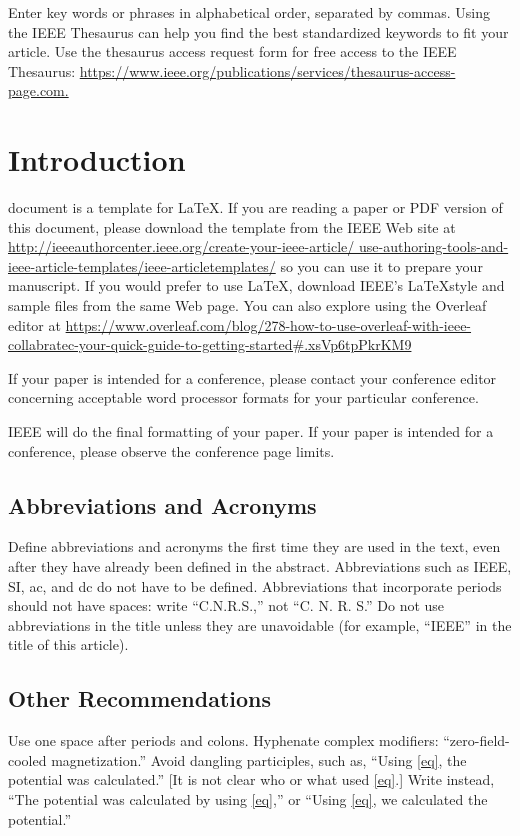 \documentclass[journal,onecolumn,web]{ieeecolor}
\begin{document}
\begin{IEEEkeywords}
Enter key words or phrases in alphabetical order, separated by commas. Using the IEEE Thesaurus can help you find the best standardized keywords to fit your article. Use the thesaurus access request form for free access to the IEEE Thesaurus: \underline{https://www.ieee.org/publications/services/thesaurus-}\discretionary{}{}{}\underline{access-page.com.}
\end{IEEEkeywords}

\section{Introduction}
\label{sec:introduction}
 document is a template for \LaTeX. If you are 
reading a paper or PDF version of this document, please download the 
template from the IEEE Web site at \underline
{http://ieeeauthorcenter.ieee.org/create-your-ieee-article/
use-}\discretionary{}{}{}\underline{authoring-tools-and-ieee-article-templates/ieee-articletemplates/} so you can use it to prepare your manuscript. If 
you would prefer to use \LaTeX, download IEEE's \LaTeX style and sample files 
from the same Web page. You can also explore using the Overleaf editor at 
\underline
{https://www.overleaf.com/blog/278-how-to-use-overleaf-with-}\discretionary{}{}{}\underline
{ieee-collabratec-your-quick-guide-to-getting-started\#.}\discretionary{}{}{}\underline{xsVp6tpPkrKM9}

If your paper is intended for a conference, please contact your conference 
editor concerning acceptable word processor formats for your particular 
conference. 

IEEE will do the final formatting of your paper. If your paper is intended 
for a conference, please observe the conference page limits. 

\subsection{Abbreviations and Acronyms}
Define abbreviations and acronyms the first time they are used in the text, 
even after they have already been defined in the abstract. Abbreviations 
such as IEEE, SI, ac, and dc do not have to be defined. Abbreviations that 
incorporate periods should not have spaces: write ``C.N.R.S.,'' not ``C. N. 
R. S.'' Do not use abbreviations in the title unless they are unavoidable 
(for example, ``IEEE'' in the title of this article).

\subsection{Other Recommendations}
Use one space after periods and colons. Hyphenate complex modifiers: 
``zero-field-cooled magnetization.'' Avoid dangling participles, such as, 
``Using \eqref{eq}, the potential was calculated.'' [It is not clear who or what 
used \eqref{eq}.] Write instead, ``The potential was calculated by using \eqref{eq},'' or 
``Using \eqref{eq}, we calculated the potential.''
\end{document}
